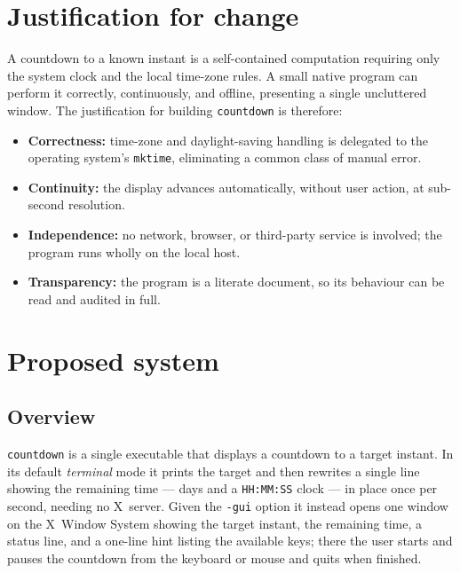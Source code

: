 \documentclass[12pt]{article}
\newcommand{\code}[1]{\texttt{#1}}
\begin{document}
\section{Justification for change}

A countdown to a known instant is a self-contained computation requiring
only the system clock and the local time-zone rules.  A small native
program can perform it correctly, continuously, and offline, presenting a
single uncluttered window.  The justification for building
\code{countdown} is therefore:

\begin{itemize}[noitemsep]
  \item \textbf{Correctness:} time-zone and daylight-saving handling is
        delegated to the operating system's \code{mktime}, eliminating a
        common class of manual error.
  \item \textbf{Continuity:} the display advances automatically, without
        user action, at sub-second resolution.
  \item \textbf{Independence:} no network, browser, or third-party service
        is involved; the program runs wholly on the local host.
  \item \textbf{Transparency:} the program is a literate document, so its
        behaviour can be read and audited in full.
\end{itemize}

\section{Proposed system}

\subsection{Overview}

\code{countdown} is a single executable that displays a countdown to a
target instant.  In its default \emph{terminal} mode it prints the target
and then rewrites a single line showing the remaining time --- days and a
\code{HH:MM:SS} clock --- in place once per second, needing no X~server.
Given the \code{-gui} option it instead opens one window on the X~Window
System showing the target instant, the remaining time, a status line, and
a one-line hint listing the available keys; there the user starts and
pauses the countdown from the keyboard or mouse and quits when finished.
\end{document}
